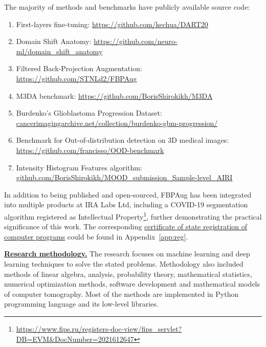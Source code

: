 The majority of methods and benchmarks have publicly available source code:

\begin{enumerate}
	\item First-layers fine-tuning: \href{https://github.com/kechua/DART20}{https://github.com/kechua/DART20}
	\item Domain Shift Anatomy: \hfill \hfill \linebreak \href{https://github.com/neuro-ml/domain_shift_anatomy}{https://github.com/neuro-ml/domain\_shift\_anatomy}
	\item Filtered Back-Projection Augmentation: \hfill \hfill \linebreak \href{https://github.com/STNLd2/FBPAug}{https://github.com/STNLd2/FBPAug}
	\item M3DA benchmark: \href{https://github.com/BorisShirokikh/M3DA}{https://github.com/BorisShirokikh/M3DA}
	\item {Burdenko's Glioblastoma Progression Dataset: \hfill \hfill \linebreak \href{https://www.cancerimagingarchive.net/collection/burdenko-gbm-progression/}{cancerimagingarchive.net/collection/burdenko-gbm-progression/}}
	\item Benchmark for Out-of-distribution detection on 3D medical images: \hfill \linebreak \href{https://github.com/francisso/OOD-benchmark}{https://github.com/francisso/OOD-benchmark}
	\item Intensity Histogram Features algorithm: \hfill \hfill \linebreak \href{https://github.com/BorisShirokikh/MOOD\_submission\_Sample-level\_AIRI}{github.com/BorisShirokikh/MOOD\_submission\_Sample-level\_AIRI}
\end{enumerate}

In addition to being published and open-sourced, FBPAug has been integrated into multiple products at IRA Labs Ltd, including a COVID-19 segmentation algorithm registered as Intellectual Property\footnote{\href{https://www.fips.ru/registers-doc-view/fips\_servlet?DB=EVM\&DocNumber=2021612647}{https://www.fips.ru/registers-doc-view/fips\_servlet?DB=EVM\&DocNumber=2021612647}}, further demonstrating the practical significance of this work. The corresponding \underline{certificate of state registration of computer programs} could be found in Appendix~\ref{app:reg}.


\underline{\textbf{Research methodology.}} The research focuses on machine learning and deep learning techniques to solve the stated problems. Methodology also included methods of linear algebra, analysis, probability theory, mathematical statistics, numerical optimization methods, software development and mathematical models of computer tomography. Most of the methods are implemented in Python programming language and its low-level libraries.


